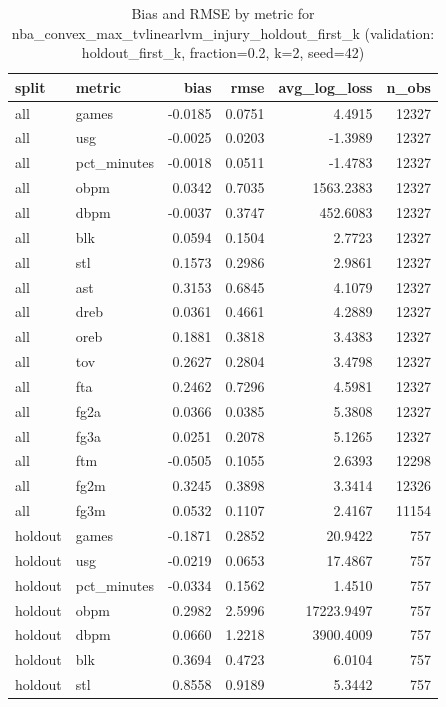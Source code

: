 \begin{table}
\caption{Bias and RMSE by metric for nba_convex_max_tvlinearlvm_injury_holdout_first_k (validation: holdout_first_k, fraction=0.2, k=2, seed=42)}
\label{tab:nba_convex_max_tvlinearlvm_injury_holdout_first_k_vs_holdout_first_k_f20_k2_s42_bias_rmse}
\begin{tabular}{llrrrr}
\toprule
split & metric & bias & rmse & avg\_log\_loss & n\_obs \\
\midrule
all & games & -0.0185 & 0.0751 & 4.4915 & 12327 \\
all & usg & -0.0025 & 0.0203 & -1.3989 & 12327 \\
all & pct\_minutes & -0.0018 & 0.0511 & -1.4783 & 12327 \\
all & obpm & 0.0342 & 0.7035 & 1563.2383 & 12327 \\
all & dbpm & -0.0037 & 0.3747 & 452.6083 & 12327 \\
all & blk & 0.0594 & 0.1504 & 2.7723 & 12327 \\
all & stl & 0.1573 & 0.2986 & 2.9861 & 12327 \\
all & ast & 0.3153 & 0.6845 & 4.1079 & 12327 \\
all & dreb & 0.0361 & 0.4661 & 4.2889 & 12327 \\
all & oreb & 0.1881 & 0.3818 & 3.4383 & 12327 \\
all & tov & 0.2627 & 0.2804 & 3.4798 & 12327 \\
all & fta & 0.2462 & 0.7296 & 4.5981 & 12327 \\
all & fg2a & 0.0366 & 0.0385 & 5.3808 & 12327 \\
all & fg3a & 0.0251 & 0.2078 & 5.1265 & 12327 \\
all & ftm & -0.0505 & 0.1055 & 2.6393 & 12298 \\
all & fg2m & 0.3245 & 0.3898 & 3.3414 & 12326 \\
all & fg3m & 0.0532 & 0.1107 & 2.4167 & 11154 \\
holdout & games & -0.1871 & 0.2852 & 20.9422 & 757 \\
holdout & usg & -0.0219 & 0.0653 & 17.4867 & 757 \\
holdout & pct\_minutes & -0.0334 & 0.1562 & 1.4510 & 757 \\
holdout & obpm & 0.2982 & 2.5996 & 17223.9497 & 757 \\
holdout & dbpm & 0.0660 & 1.2218 & 3900.4009 & 757 \\
holdout & blk & 0.3694 & 0.4723 & 6.0104 & 757 \\
holdout & stl & 0.8558 & 0.9189 & 5.3442 & 757 \\

\end{tabular}
\end{table}
